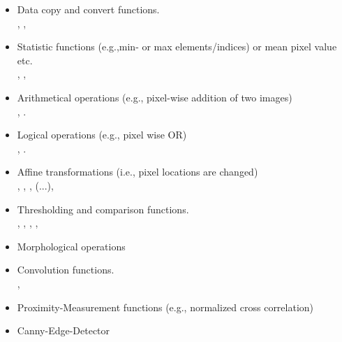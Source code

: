 \begin{itemize}

\item Data copy and convert functions.\\
, , 

\item Statistic functions (e.g.,min- or max elements/indices) or mean pixel value etc.\\
, , 

\item Arithmetical operations (e.g., pixel-wise addition of two images)\\
, .

\item Logical operations (e.g., pixel wise OR)\\ 
, .

\item Affine transformations (i.e., pixel locations are changed)\\
, , , (...),   

\item Thresholding and comparison functions.\\
, , , , 

\item Morphological operations\\

\item Convolution functions.\\
, 

\item Proximity-Measurement functions (e.g., normalized cross correlation)\\

\item Canny-Edge-Detector\\


\end{itemize}
